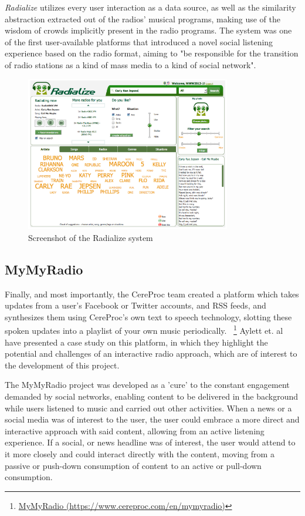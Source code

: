 \textit{Radialize} utilizes every user interaction as a data source, as well as the similarity abstraction extracted out of the radios’ musical programs, making use of the wisdom of crowds implicitly present in the radio programs. The system was one of the first user-available platforms that introduced a novel social listening experience based on the radio format, aiming to "be responsible for the transition of radio stations as a kind of mass media to a kind of social network".~\cite{Pereira2013}


\begin{figure}[h]
\centering
\includegraphics[width=0.8\textwidth]{./Images/radialize.png}
\caption{Screenshot of the Radialize system}
\label{fig:test_env}
\end{figure}

\subsection{MyMyRadio}

Finally, and most importantly, the CereProc team created a platform which takes updates from a user's Facebook or Twitter accounts, and RSS feeds, and synthesizes them using CereProc's own text to speech technology, slotting these spoken updates into a playlist of your own music periodically. ~\footnote{\href{https://www.cereproc.com/en/mymyradio}{MyMyRadio (https://www.cereproc.com/en/mymyradio)}} Aylett et. al~\cite{Aylett2015} have presented a case study on this platform, in which they highlight the potential and challenges of an interactive radio approach, which are of interest to the development of this project.

The MyMyRadio project was developed as a 'cure' to the constant engagement demanded by social networks, enabling content to be delivered in the background while users listened to music and carried out other activities. When a news or a social media was of interest to the user, the user could embrace a more direct and interactive approach with said content, allowing from an active listening experience. If a social, or news headline was of interest, the user would attend to it more closely and could interact directly with the content, moving from a passive or push-down consumption of content to an active or pull-down consumption.

